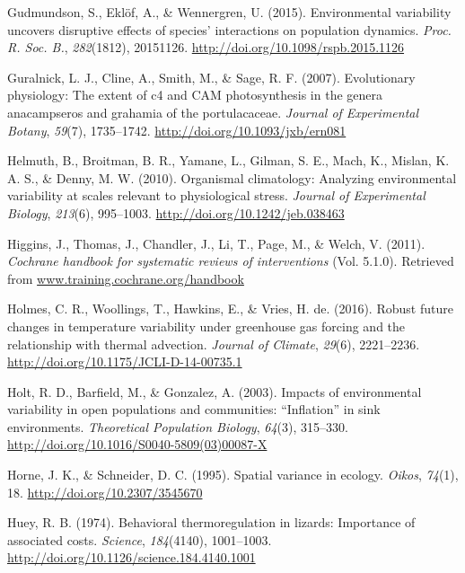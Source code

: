 \documentclass[12pt,twoside]{reedthesis}
\begin{document}
\leavevmode\hypertarget{ref-gudmundson_environmental_2015}{}%
Gudmundson, S., Eklöf, A., \& Wennergren, U. (2015). Environmental variability uncovers disruptive effects of species' interactions on population dynamics. \emph{Proc. R. Soc. B.}, \emph{282}(1812), 20151126. \url{http://doi.org/10.1098/rspb.2015.1126}

\leavevmode\hypertarget{ref-guralnick_evolutionary_2007}{}%
Guralnick, L. J., Cline, A., Smith, M., \& Sage, R. F. (2007). Evolutionary physiology: The extent of c4 and CAM photosynthesis in the genera anacampseros and grahamia of the portulacaceae. \emph{Journal of Experimental Botany}, \emph{59}(7), 1735--1742. \url{http://doi.org/10.1093/jxb/ern081}

\leavevmode\hypertarget{ref-helmuth_organismal_2010}{}%
Helmuth, B., Broitman, B. R., Yamane, L., Gilman, S. E., Mach, K., Mislan, K. A. S., \& Denny, M. W. (2010). Organismal climatology: Analyzing environmental variability at scales relevant to physiological stress. \emph{Journal of Experimental Biology}, \emph{213}(6), 995--1003. \url{http://doi.org/10.1242/jeb.038463}

\leavevmode\hypertarget{ref-higgins_cochrane_2011}{}%
Higgins, J., Thomas, J., Chandler, J., Li, T., Page, M., \& Welch, V. (2011). \emph{Cochrane handbook for systematic reviews of interventions} (Vol. 5.1.0). Retrieved from \url{www.training.cochrane.org/handbook}

\leavevmode\hypertarget{ref-holmes_robust_2016}{}%
Holmes, C. R., Woollings, T., Hawkins, E., \& Vries, H. de. (2016). Robust future changes in temperature variability under greenhouse gas forcing and the relationship with thermal advection. \emph{Journal of Climate}, \emph{29}(6), 2221--2236. \url{http://doi.org/10.1175/JCLI-D-14-00735.1}

\leavevmode\hypertarget{ref-holt_impacts_2003}{}%
Holt, R. D., Barfield, M., \& Gonzalez, A. (2003). Impacts of environmental variability in open populations and communities: ``Inflation'' in sink environments. \emph{Theoretical Population Biology}, \emph{64}(3), 315--330. \url{http://doi.org/10.1016/S0040-5809(03)00087-X}

\leavevmode\hypertarget{ref-horne_spatial_1995}{}%
Horne, J. K., \& Schneider, D. C. (1995). Spatial variance in ecology. \emph{Oikos}, \emph{74}(1), 18. \url{http://doi.org/10.2307/3545670}

\leavevmode\hypertarget{ref-huey_behavioral_1974}{}%
Huey, R. B. (1974). Behavioral thermoregulation in lizards: Importance of associated costs. \emph{Science}, \emph{184}(4140), 1001--1003. \url{http://doi.org/10.1126/science.184.4140.1001}
\end{document}
